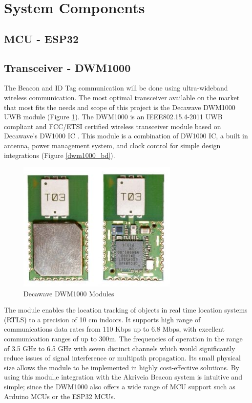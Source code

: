 

\setcounter{section}{2}
\section{System Components}
\bigskip

\subsection{MCU - ESP32}













\pagebreak
\subsection{Transceiver - DWM1000} 
\medskip
The Beacon and ID Tag communication will be done using ultra-wideband wireless communication. The most optimal transceiver available on the market that most fits the needs and scope of this project is the Decawave DWM1000 UWB module (Figure \ref{dwm1000}). The DWM1000 is an IEEE802.15.4-2011 UWB compliant and FCC/ETSI certified wireless transceiver module based on Decawave’s DW1000 IC \cite{R4-2-1}. This module is a combination of DW1000 IC, a built in antenna, power management system, and clock control for simple design integrations (Figure \ref{dwm1000_bd}). 

\medskip
\begin{figure}[H]
\centering
    \includegraphics[scale=0.75]{./images/dwm1000.jpg}
    \caption{Decawave DWM1000 Modules}
    \label{dwm1000}
\end{figure}

The module enables the location tracking of objects in real time location systems (RTLS) to a precision of 10 cm indoors. It supports high range of communications data rates from 110 Kbps up to 6.8 Mbps, with excellent communication ranges of up to 300m. The frequencies of operation in the range of 3.5 GHz to 6.5 GHz with seven distinct channels which would significantly reduce issues of signal interference or multipath propagation. Its small physical size allows the module to be implemented in highly cost-effective solutions. By using this modul,e integration with the Akriveia Beacon system is intuitive and simple; since the DWM1000 also offers a wide range of MCU support such as Arduino MCUs or the ESP32 MCUs. 

